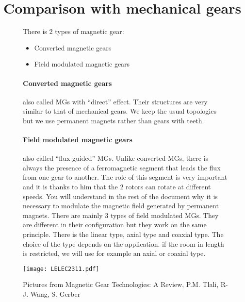 \section{Comparison with mechanical gears}

\begin{figure}[H]
    \begin{minipage}{.45\linewidth}
        
        There is 2 types of magnetic gear: 
        \begin{itemize}
            \item Converted magnetic gears
            \item Field modulated magnetic gears
        \end{itemize}
        
        \paragraph{Converted magnetic gears} also called MGs with ``direct'' effect. Their structures are very similar to that of mechanical gears. We keep the usual topologies but we use permanent magnets rather than gears with teeth.
        
        \paragraph {Field modulated magnetic gears} also called ``flux guided'' MGs. Unlike converted MGs, there is always the presence of a ferromagnetic segment that leads the flux from one gear to another. The role of this segment is very important and it is thanks to him that the 2 rotors can rotate at different speeds. You will understand in the rest of the document why it is necessary to modulate the magnetic field generated by permanent magnets. There are mainly 3 types of field modulated MGs. They are different in their configuration but they work on the same principle. There is the linear type, axial type and coaxial type. The choice of the type depends on the application. if the room in length is restricted, we will use for example an axial or coaxial type.
        
    \end{minipage}
    \hfill%
    \begin{minipage}[c]{.45\linewidth}
        \centering
        \texttt{[image: LELEC2311.pdf]}
        \caption{Pictures from Magnetic Gear Technologies: A Review, P.M. Tlali, R-J. Wang, S. Gerber}
    \end{minipage}
\end{figure}


